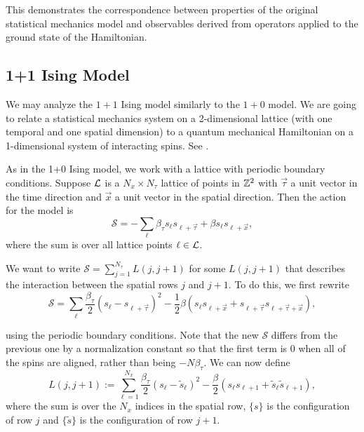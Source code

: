 \documentclass[11pt,reqno]{amsart}
\begin{document}
	This demonstrates the correspondence between properties of the original statistical mechanics model and observables derived from operators applied to the ground state of the Hamiltonian.
	
	\subsection{1+1 Ising Model}
	
	We may analyze the $1+1$ Ising model similarly to the $1+0$ model. 
	We are going to relate a statistical mechanics system on a 2-dimensional lattice (with one temporal and one spatial dimension) to a quantum mechanical Hamiltonian on a 1-dimensional system of interacting spins.  
	See \cite{FradkinSusskind78,KogutGaugeSummary}.
	
	As in the 1+0 Ising model, we work with a lattice with periodic boundary conditions. 
	Suppose $\mathcal{L}$ is a $N_x \times N_\tau$ lattice of points in $\mathbb{Z}^2$ with $\vec{\tau}$ a unit vector in the time direction and $\vec{x}$ a unit vector in the spatial direction. 
	Then the action for the model is 
	\[ \mathcal{S}= -\sum_{\ell} \beta_\tau s_{\ell}s_{\ell+\vec{\tau}}+\beta s_{\ell}s_{\ell+\vec{x}}, \]
	where the sum is over all lattice points $\ell \in \mathcal{L}$.
	
	We want to write $\mathcal{S}=\sum_{j=1}^{N_\tau} L(j,j+1)$ for some $L(j,j+1)$ that describes the interaction between the spatial rows $j$ and $j+1$.
	To do this, we first rewrite 
	\[\mathcal{S}=\sum_{\ell}\frac{\beta_\tau}{2}(s_{\ell}-s_{\ell+\vec{\tau}})^2 -\frac{1}{2}\beta (s_\ell s_{\ell+\vec{x}}+s_{\ell+\vec{\tau}}s_{\ell+\vec{\tau}+\vec{x}}), \]
	
	using the periodic boundary conditions. 
	Note that the new $\mathcal{S}$ differs from the previous one by a normalization constant so that the first term is 0 when all of the spins are aligned, rather than being $-N\beta_\tau$.
	We can now define 
	\[L(j,j+1):= \sum_{\ell=1}^{N_x} \frac{\beta_\tau}{2} (s_\ell-\tilde{s}_\ell)^2-\frac{\beta}{2}(s_\ell s_{\ell+1}+\tilde{s}_\ell \tilde{s}_{\ell+1}), \]
	where the sum is over the $N_x$ indices in the spatial row, $\{s\}$ is the configuration of row $j$ and $\{\tilde{s}\}$ is the configuration of row $j+1$.
	
\end{document}
